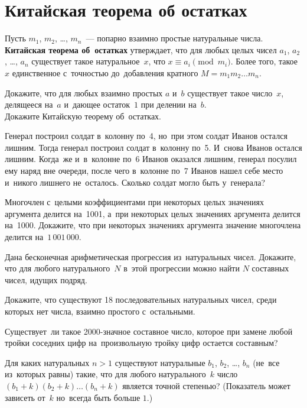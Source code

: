 
\section*{Китайская теорема об остатках}


Пусть $m_{1}$, $m_{2}$, \ldots, $m_{n}$~--- попарно взаимно простые натуральные
числа.
\\
\textbf{Китайская теорема об~остатках} утверждает, что для любых целых чисел
$a_{1}$, $a_{2}$, \ldots, $a_{n}$ существует такое натуральное~$x$, что
$x \equiv a_i  \pmod{m_{i}}$.
Более того, такое $x$ единственное с~точностью до~добавления кратного
$M = m_{1} m_{2} \ldots m_{n}$.

\begin{problems}

\item
\subproblem
Докажите, что для любых взаимно простых $a$ и~$b$ существует такое число~$x$,
делящееся на~$a$ и~дающее остаток~$1$ при делении на~$b$.
\\
\subproblem
Докажите Китайскую теорему об~остатках.

\item
Генерал построил солдат в~колонну по~4, но~при этом солдат Иванов остался
лишним.
Тогда генерал построил солдат в~колонну по~5.
И~снова Иванов остался лишним.
Когда~же и~в~колонне по~6 Иванов оказался лишним, генерал посулил ему наряд вне
очереди, после чего в~колонне по~7 Иванов нашел себе место и~никого лишнего
не~осталось.
Сколько солдат могло быть у~генерала?

\item
Многочлен с~целыми коэффициентами при некоторых целых значениях аргумента
делится на~1001, а~при некоторых целых значениях аргумента делится на~1000.
Докажите, что при некоторых значениях аргумента значение многочлена делится
на~$1\,001\,000$.

\item
Дана бесконечная арифметическая прогрессия из~натуральных чисел.
Докажите, что для любого натурального~$N$ в~этой прогрессии можно найти $N$
составных чисел, идущих подряд.

\item
Докажите, что существуют 18 последовательных натуральных чисел, среди которых
нет числа, взаимно простого с~остальными.

\item
Существует~ли такое 2000-значное составное число, которое при замене любой
тройки соседних цифр на~произвольную тройку цифр остается составным?

\item
Для каких натуральных $n > 1$ существуют натуральные
$b_1$, $b_2$, \ldots, $b_n$ (не~все из~которых равны) такие, что для любого
натурального~$k$ число $(b_{1} + k) (b_{2} + k) \ldots (b_{n} + k)$ является
точной степенью?
(Показатель может зависеть от~$k$ но~всегда быть больше $1$.)

\end{problems}

